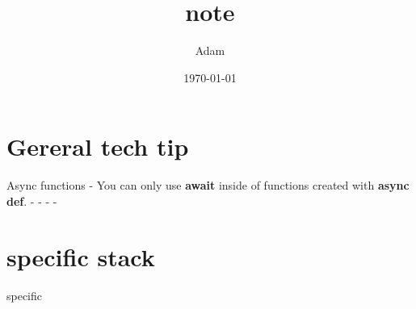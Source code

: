 \documentclass[12pt]{article}
\title{note}
\author{Adam}
\date{\today}
\begin{document}
\maketitle

\section{Gereral tech tip}
\large{Async functions}
- You can only use \textbf{await} inside of functions created with \textbf{async def}.
\large{}
- 
\large{}
- 
\large{}
- 
\large{}
- 

\section{specific stack}
specific
\end{document}
